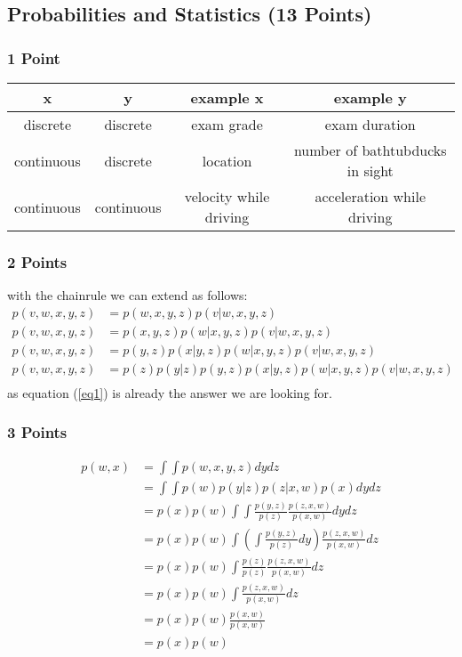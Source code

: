 \newif\ifvimbug
\vimbugfalse

\ifvimbug

\fi


\subsection{Probabilities and Statistics (13 Points)}
\subsubsection{1 Point}
\begin{tabular}{|c|c||c|c|}
x & y  & example x & example y \\\hline
discrete & discrete & exam grade & exam duration \\
continuous & discrete & location & number of bathtubducks in sight\\
continuous & continuous & velocity while driving & acceleration while driving\\
\end{tabular}
\subsubsection{2 Points}
 with the chainrule we can extend  as follows:
 \begin{align}
p(v,w,x,y,z) &= p(w,x,y,z)p(v|w,x,y,z)\\
p(v,w,x,y,z) &= p(x,y,z)p(w|x,y,z)p(v|w,x,y,z) \label{eq1} \\
p(v,w,x,y,z) &= p(y,z) p(x|y,z)p(w|x,y,z)p(v|w,x,y,z)\\
p(v,w,x,y,z) &=  p(z) p(y|z) p(y,z) p(x|y,z)p(w|x,y,z)p(v|w,x,y,z)\\
\end{align}
as equation (\ref{eq1}) is already the answer we are looking for.
\subsubsection{3 Points}
 \begin{align*}
p(w,x) &= \int \int p(w,x,y,z) dy dz \\
&= \int \int p(w) p(y|z) p(z|x,w) p(x) dy dz\\
&= p(x) p(w) \int \int \frac{p(y,z)}{p(z)} \frac{p(z,x,w)}{p(x,w)} dy dz\\
&= p(x) p(w) \int (\int \frac{p(y,z)}{p(z)}dy) \frac{p(z,x,w)}{p(x,w)}  dz\\
&= p(x) p(w) \int \frac{p(z)}{p(z)} \frac{p(z,x,w)}{p(x,w)}  dz\\
&= p(x) p(w) \int \frac{p(z,x,w)}{p(x,w)}  dz\\
&= p(x) p(w) \frac{p(x,w)}{p(x,w)}\\
&= p(x) p(w) \\
\end{align*}
